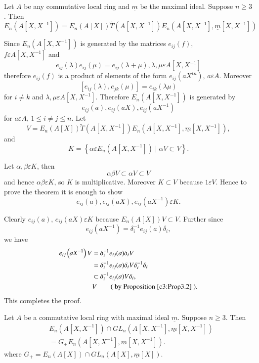 \begin{thm}\label{c3:thm3.8}
Let $A$ be any commutative local ring and $\underline{m}$ be the
maximal ideal. Suppose $n\geq 3$. Then 
$$
E_n\left(A\left[X,X^{-1}\right]\right)=E_n(A[X])\tilde{T}\left(A\left[X,X^{-1}\right]\right)E_n\left(A\left[X,X^{-1}\right],\underline{m}\left[X,X^{-1}\right]\right)
$$
\end{thm}

\begin{Proof}
Since $E_n\left(A\left[X,X^{-1}\right]\right)$ is generated by the
matrices $e_{ij}(f)$,\\ $f\varepsilon A\left[X,X^{-1}\right]$ and 
$$
e_{ij}(\lambda)e_{ij}(\mu)=e_{ij}(\lambda+\mu),\lambda,\mu \varepsilon A[X,X^{-1}]
$$
therefore $e_{ij}(f)$ is a product of elements of the form
$e_{ij}\left(aX^{tn}\right)$, $a\varepsilon A$. Moreover
$$
[e_{ij}(\lambda),e_{jk}(\mu)]=e_{ik}(\lambda \mu)
$$
for $i\neq k$ and $\lambda,\mu\varepsilon
A\left[X,X^{-1}\right]$. Therefore $E_n\left(A\left[X,X^{-1}\right]\right)$
is generated by 
$$
e_{ij}(a),e_{ij}(aX), e_{ij}\left(aX^{-1}\right)
$$
for $a\varepsilon A$, $1\leq i\neq j\leq n$. Let 
$$
V=E_n(A[X])\tilde{T}\left(A\left[X,X^{-1}\right]\right)E_n\left(A\left[X,X^{-1}\right],\underline{m}\left[X,X^{-1}\right]\right),
$$
and
$$
K=\left\{\alpha \varepsilon E_n\left(A\left[X,X^{-1}\right]\right) \mid
\alpha V\subset V\right\}.
$$

Let $\alpha, \beta \varepsilon K$, then
$$
\alpha\beta V\subset \alpha V\subset V
$$
and hence $\alpha\beta \varepsilon K$, so $K$ is
multiplicative. Moreover $K\subset V$ because $1\varepsilon V$. Hence
to prove the theorem it is enough to show
$$
e_{ij}(a),e_{ij}(aX),e_{ij}\left(aX^{-1}\right)\varepsilon K.
$$

Clearly $e_{ij}(a)$, $e_{ij}(aX)\varepsilon K$ because
$E_n(A[X])V\subset V$. Further since 
$$
e_{ij}\left(aX^{-1}\right)=\delta^{-1}_ie_{ij}(a)\delta_i,
$$
we have
$$
\begin{aligned}
e_{ij}\left(aX^{-1}\right)V&=\delta^{-1}_ie_{ij}(a)\delta_iV\\
&{}=\delta^{-1}_ie_{ij}(a)\delta_iV\delta^{-1}_i\delta_i\\
&{}\subset \delta^{-1}_ie_{ij}(a)V\delta_i, \\
&{}V\qquad (\text{ by Proposition~\ref{c3:Prop3.2} }).
\end{aligned}
$$
This completes the proof.
\enprf
\end{Proof}


\begin{coro}\label{c3:coro3.9}
Let $A$ be a commutative local ring with maximal ideal
$\underline{m}$. Suppose $n\geq 3$. Then 
$$
\begin{aligned}
&E_n\left(A\left[X,X^{-1}\right]\right)\cap
GL_n\left(A\left[X,X^{-1}\right],\underline{m}\left[X,X^{-1}\right]\right)\\
&=G_+E_n\left(A\left[X,X^{-1}\right],\underline{m}\left[X,X^{-1}\right]\right).
\end{aligned}
$$
where $G_+=E_n(A[X])\cap GL_n(A[X],\underline{m}[X])$. 
\end{coro}


